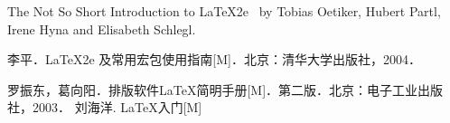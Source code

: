 \begin{thebibliography}{99}\setlength{\itemsep}{-0.1mm}
\begin{spacing}{1.2}

The Not So Short Introduction to \LaTeX2e \ by Tobias Oetiker, Hubert Partl, Irene Hyna and Elisabeth Schlegl.

李平．\LaTeX2e 及常用宏包使用指南[M]．北京：清华大学出版社，2004．

罗振东，葛向阳．排版软件\LaTeX 简明手册[M]．第二版．北京：电子工业出版社，2003．
刘海洋. \LaTeX 入门[M]
\end{spacing}
\end{thebibliography}
